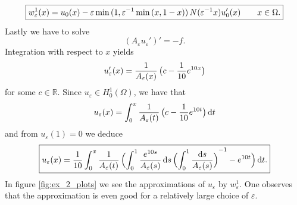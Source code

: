 \begin{example}
\begin{equation}
		\boxed{w_\varepsilon^1(x) = u_0(x) - \varepsilon \min\del[0]{1,\varepsilon^{-1}\min\del[0]{x,1 - x}}N(\varepsilon^{-1}x)u'_0(x) \qquad x \in \Omega.}	
	\end{equation}
	Lastly we have to solve
	\begin{equation}
	(A_\varepsilon u_\varepsilon')' = -f.
	\end{equation}
	Integration with respect to $x$ yields
	\begin{equation}
	u_\varepsilon'(x) = \frac{1}{A_\varepsilon(x)}\del[1]{c - \frac{1}{10}e^{10x}}
	\end{equation}
	\noindent for some $c \in \mathbb{R}$. Since $u_\varepsilon \in H^1_0(\Omega)$, we have that 
	\begin{equation}
	u_\varepsilon(x) = \int_0^x \frac{1}{A_\varepsilon(t)}\del[1]{c - \frac{1}{10}e^{10t}}\d t
	\end{equation}
	\noindent and from $u_\varepsilon(1) = 0$ we deduce
	\begin{equation}
	\boxed{u_\varepsilon(x) = \frac{1}{10}\int_0^x \frac{1}{A_\varepsilon(t)}\del[2]{\int_0^1 \frac{e^{10s}}{A_\varepsilon(s)}\d s \del[2]{\int_0^1 \frac{\d s}{A_\varepsilon(s)}}^{-1} - e^{10t}}\d t.}
	\end{equation}
	In figure \ref{fig:ex_2_plots} we see the approximations of $u_\varepsilon$ by $w_\varepsilon^1$. One observes that the approximation is even good for a relatively large choice of $\varepsilon$. 
	

\end{example}
